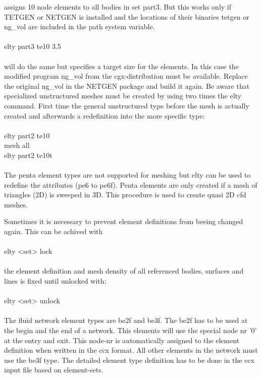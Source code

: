 \documentclass{article}
\begin{document}
assigns 10 node elements to all bodies in set part3. But this works only if TETGEN \cite{TETGEN} or NETGEN \cite{NETGEN} is installed and the locations of their binaries tetgen or ng\_vol are included in the path system variable.\\\\
elty part3 te10 3.5\\\\
will do the same but specifies a target size for the elements. In this case the modified program ng\_vol from the cgx-distribution must be available. Replace the original ng\_vol in the NETGEN package and build it again. 
Be aware that specialized unstructured meshes must be created by using two times the elty command. First time the general unstructured type before the mesh is actually created and afterwards a redefinition into the more specific type:\\\\
elty part2 te10\\
mesh all\\
elty part2 te10t\\\\

The penta element types are not supported for meshing but elty can be used to redefine the attributes (pe6 to pe6f). Penta elements are only created if a mesh of triangles (2D) is sweeped in 3D. This procedure is used to create quasi 2D cfd meshes.

Sometimes it is necessary to prevent element definitions from beeing changed again. This can be achived with\\\\ elty <set> lock\\\\ the element definition and mesh density of all referenced bodies, surfaces and lines is fixed until unlocked with:\\\\ elty <set> unlock\\\\

The fluid network element types are be2f and be3f. The be2f has to be used at the begin and the end of a network. This elements will use the special node nr '0' at the entry and exit. This node-nr is automatically assigned to the element definition when written in the ccx format. All other elements in the network must use the be3f type. The detailed element type definition has to be done in the ccx input file based on element-sets.
\end{document}
